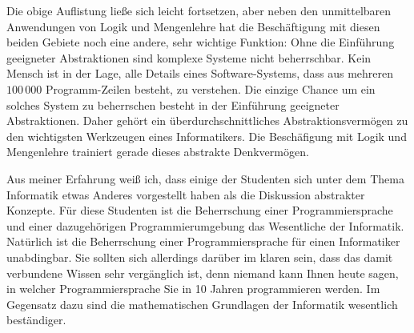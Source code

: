 Die obige Auflistung ließe sich leicht fortsetzen, aber
neben den unmittelbaren Anwendungen von Logik und Mengenlehre hat die Beschäftigung mit
diesen beiden Gebiete noch eine andere, sehr wichtige Funktion:
Ohne die Einführung geeigneter Abstraktionen sind komplexe Systeme nicht beherrschbar.
Kein Mensch ist in der Lage, alle Details eines Software-Systems, dass aus mehreren
$100\,000$ Programm-Zeilen besteht, zu verstehen.   Die einzige Chance um ein solches
System zu beherrschen besteht in der Einführung geeigneter Abstraktionen.
Daher gehört ein überdurchschnittliches Abstraktionsvermögen zu den wichtigsten Werkzeugen
eines Informatikers.  Die Beschäfigung mit Logik und Mengenlehre trainiert gerade dieses
abstrakte Denkvermögen. 


Aus meiner Erfahrung weiß ich, dass einige der Studenten sich unter dem Thema Informatik etwas Anderes
vorgestellt haben als die Diskussion abstrakter Konzepte.  Für diese Studenten ist die Beherrschung
einer Programmiersprache und einer dazugehörigen Programmierumgebung das Wesentliche der Informatik.
Natürlich ist die Beherrschung einer Programmiersprache für einen Informatiker unabdingbar.  Sie
sollten sich allerdings darüber im klaren sein, dass das damit verbundene Wissen sehr vergänglich
ist, denn niemand kann Ihnen heute sagen, in welcher Programmiersprache Sie in 10 Jahren programmieren werden.
Im Gegensatz dazu sind die mathematischen Grundlagen der Informatik wesentlich beständiger.


